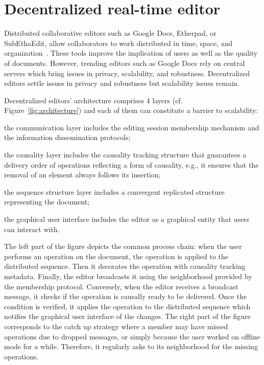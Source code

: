 
\section{Decentralized real-time editor}
\label{sec:editor}

Distributed collaborative editors such as Google Docs, Etherpad, or SubEthaEdit,
allow collaborators to work distributed in time, space, and
organization~\cite{ellis1991groupware}. These tools improve the implication of
users as well as the quality of documents. However, trending editors such as
Google Docs rely on central servers which bring issues in privacy, scalability,
and robustness. Decentralized editors settle issues in privacy and robustness
but scalability issues remain.

Decentralized editors' architecture comprises 4 layers
(cf. Figure~\ref{fig:architecture}) and each of them can constitute a barrier to
scalability:
\begin{inparaenum}[(i)]
\item the communication layer includes the editing session membership mechanism
  and the information dissemination protocols;
\item the causality layer includes the causality tracking structure that
  guarantees a delivery order of operations reflecting a form of causality,
  e.g., it ensures that the removal of an element always follows its insertion;
\item the sequence structure layer includes a convergent replicated structure
  representing the document;
\item the graphical user interface includes the editor as a graphical entity
  that users can interact with. %
\end{inparaenum}

The left part of the figure depicts the common process chain: when the user
performs an operation on the document, the operation is applied to the
distributed sequence. Then it decorates the operation with causality tracking
metadata. Finally, the editor broadcasts it using the neighborhood provided by
the membership protocol.  Conversely, when the editor receives a broadcast
message, it checks if the operation is causally ready to be delivered. Once the
condition is verified, it applies the operation to the distributed sequence
which notifies the graphical user interface of the changes.  The right part of
the figure corresponds to the catch up strategy where a member may have missed
operations due to dropped messages, or simply because the user worked on offline
mode for a while. Therefore, it regularly asks to its neighborhood for the
missing operations.

